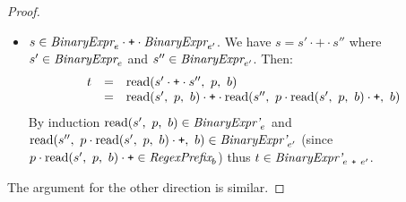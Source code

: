 \documentclass[preprint,10pt]{sigplanconf}
\begin{document}
\begin{proof}
\begin{itemize}
    \item \( s \in \textit{BinaryExpr}_{e} \cdot \texttt{+} \cdot
      \textit{BinaryExpr}_{e'} \). We have \( s = s' \cdot \texttt{+}
      \cdot s'' \) where \( s' \in \textit{BinaryExpr}_{e} \) and \( s''
      \in \textit{BinaryExpr}_{e'} \). Then:
    \[
    \begin{array}{rcl}
      t &=& \textrm{read}(s'\cdot \texttt{+} \cdot s'',~p,~b)
      \\
      &=& \textrm{read}(s',~p,~b) \cdot \texttt{+} \cdot 
      \textrm{read}(s'',~
        p \cdot \textrm{read}(s',~p,~b) \cdot \texttt{+}
      ,~b)
    \end{array}
    \]
    By induction \( \textrm{read}(s',~p,~b) \in \textit{BinaryExpr'}_{e}
    \) and \( \textrm{read}(s'',~ p \cdot \textrm{read}(s',~p,~b) \cdot \texttt{+}
    ,~b) \in \textit{BinaryExpr'}_{e'} \) (since \( p \cdot
    \textrm{read}(s',~p,~b) \cdot \texttt{+} \in \textit{RegexPrefix}_b \)) thus \( t \in
    \textit{BinaryExpr'}_{e~\texttt{+}~e'} \).
  \end{itemize}
  
  The argument for the other direction is similar.
\end{proof}
\end{document}
